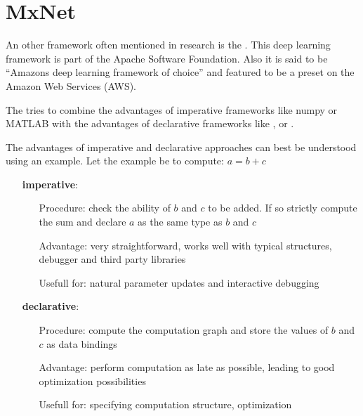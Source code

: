 
\section{MxNet}\label{sec: MxNet}

An other framework often mentioned in research is the \mxnet. This deep learning framework is part of the Apache Software Foundation. Also it is said to be ``Amazons deep learning framework of choice'' \cite{infoworld} and featured to be a preset on the Amazon Web Services (AWS). \cite{chenmxnet}

The \mxnet tries to combine the advantages of imperative frameworks like numpy or MATLAB with the advantages of declarative frameworks like \caffe, \caffetwo or \tensorflow.

The advantages of imperative and declarative approaches can best be understood using an example.
Let the example be to compute: $a = b+c$
\begin{itemize}
	\item[] \textbf{imperative}:
		\begin{itemize}
			\setlength{\itemindent}{1.5 cm}
			\item[Procedure:] check the ability of $b$ and $c$ to be added. If so strictly compute the sum and declare $a$ as the same type as $b$ and $c$
			\item[Advantage:] very straightforward, works well with typical structures, debugger and third party libraries
			\item[Usefull for:] natural parameter updates and interactive debugging
		\end{itemize}
	\item[] \textbf{declarative}:
		\begin{itemize}
			\setlength{\itemindent}{1.5cm}
			\item[Procedure:] compute the computation graph and store the values of $b$ and $c$ as data bindings
			\item[Advantage:] perform computation as late as possible, leading to good optimization possibilities
			\item[Usefull for:] specifying computation structure, optimization
		\end{itemize}
\end{itemize}


